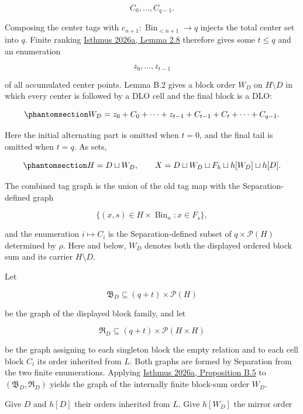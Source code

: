 \documentclass[
  english,
  11pt,
  reqno]{amsart}
\begin{document}
\[
C_0,\ldots,C_{q-1}.
\]

Composing the center tags with
\(c_{n+1}:\operatorname{Bin}_{<n+1}\to q\) injects the total center set
into \(q\). Finite ranking \hyperref[ref:isthmus2026a]{Isthmus 2026a,
Lemma 2.8} therefore gives some \(t\le q\) and an enumeration

\[
z_0,\ldots,z_{t-1}
\]

of all accumulated center points. Lemma B.2 gives a block order \(W_D\)
on \(H\setminus D\) in which every center is followed by a DLO cell and
the final block is a DLO:

\begin{equation}\protect\phantomsection\label{eq:typefree-localized-complement}{
W_D
=
z_0+C_0+\cdots+z_{t-1}+C_{t-1}
+C_t+\cdots+C_{q-1}.
}\end{equation}

Here the initial alternating part is omitted when \(t=0\), and the final
tail is omitted when \(t=q\). As sets,

\begin{equation}\protect\phantomsection\label{eq:typefree-localized-carrier-partition}{
H=D\sqcup W_D,
\qquad
X=D\sqcup W_D\sqcup F_h\sqcup h[W_D]\sqcup h[D].
}\end{equation}

The combined tag graph is the union of the old tag map with the
Separation-defined graph

\[
\{(x,s)\in H\times\operatorname{Bin}_n:x\in F_s\},
\]

and the enumeration \(i\mapsto C_i\) is the Separation-defined subset of
\(q\times\mathcal P(H)\) determined by \(\rho\). Here and below, \(W_D\)
denotes both the displayed ordered block sum and its carrier
\(H\setminus D\).

Let

\[
\mathfrak B_D\subseteq(q+t)\times\mathcal P(H)
\]

be the graph of the displayed block family, and let

\[
\mathfrak R_D\subseteq(q+t)\times\mathcal P(H\times H)
\]

be the graph assigning to each singleton block the empty relation and to
each cell block \(C_i\) its order inherited from \(L\). Both graphs are
formed by Separation from the two finite enumerations. Applying
\hyperref[ref:isthmus2026a]{Isthmus 2026a, Proposition B.5} to
\((\mathfrak B_D,\mathfrak R_D)\) yields the graph of the internally
finite block-sum order \(W_D\).

Give \(D\) and \(h[D]\) their orders inherited from \(L\). Give
\(h[W_D]\) the mirror order
\end{document}
